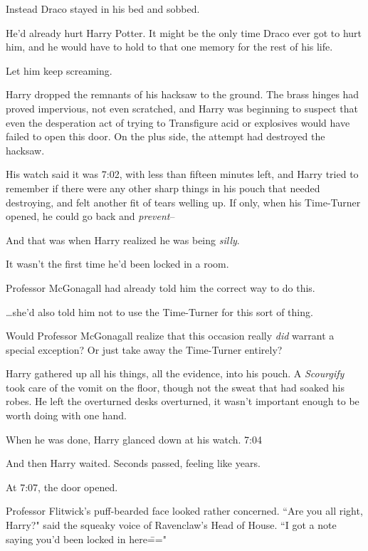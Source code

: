 Instead Draco stayed in his bed and sobbed.

He'd already hurt Harry Potter. It might be the only time Draco ever got to hurt him, and he would have to hold to that one memory for the rest of his life.

Let him keep screaming.

\later

Harry dropped the remnants of his hacksaw to the ground. The brass hinges had proved impervious, not even scratched, and Harry was beginning to suspect that even the desperation act of trying to Transfigure acid or explosives would have failed to open this door. On the plus side, the attempt had destroyed the hacksaw.

His watch said it was 7:02\pm, with less than fifteen minutes left, and Harry tried to remember if there were any other sharp things in his pouch that needed destroying, and felt another fit of tears welling up. If only, when his Time-Turner opened, he could go back and \emph{prevent}\---

And that was when Harry realized he was being \emph{silly}.

It wasn't the first time he'd been locked in a room.

Professor McGonagall had already told him the correct way to do this.

{\ldots}she'd also told him not to use the Time-Turner for this sort of thing.

Would Professor McGonagall realize that this occasion really \emph{did} warrant a special exception? Or just take away the Time-Turner entirely?

Harry gathered up all his things, all the evidence, into his pouch. A \emph{Scourgify} took care of the vomit on the floor, though not the sweat that had soaked his robes. He left the overturned desks overturned, it wasn't important enough to be worth doing with one hand.

When he was done, Harry glanced down at his watch. 7:04\pm

And then Harry waited. Seconds passed, feeling like years.

At 7:07\pm, the door opened.

Professor Flitwick's puff-bearded face looked rather concerned. ``Are you all right, Harry?" said the squeaky voice of Ravenclaw's Head of House. ``I got a note saying you'd been locked in here\==="

